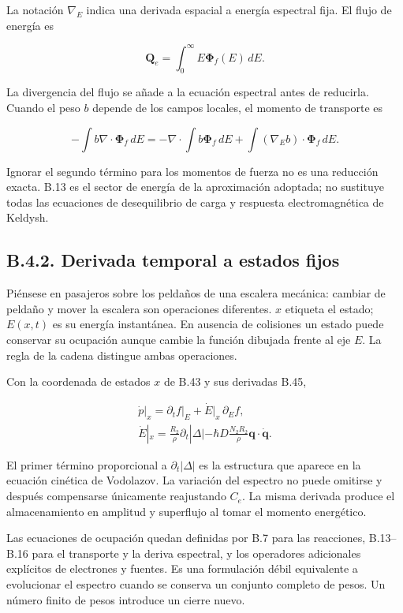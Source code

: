\documentclass[
  spanish,
  10pt,
  a4paper,
]{article}
\begin{document}
La notación \(\nabla_E\) indica una derivada espacial a energía
espectral fija. El flujo de energía es

\[
\mathbf Q_e=\int_0^\infty E\boldsymbol\Phi_f(E)\,dE.
\tag{B.14}
\]

La divergencia del flujo se añade a la ecuación espectral antes de
reducirla. Cuando el peso \(b\) depende de los campos locales, el
momento de transporte es

\[
-\int b\nabla\cdot\boldsymbol\Phi_f\,dE
=-\nabla\cdot\int b\boldsymbol\Phi_f\,dE
+\int(\nabla_Eb)\cdot\boldsymbol\Phi_f\,dE. \tag{B.15}
\]

Ignorar el segundo término para los momentos de fuerza no es una
reducción exacta. B.13 es el sector de energía de la aproximación
adoptada; no sustituye todas las ecuaciones de desequilibrio de carga y
respuesta electromagnética de Keldysh.

\subsection{B.4.2. Derivada temporal a estados
fijos}\label{b.4.2.-derivada-temporal-a-estados-fijos}

Piénsese en pasajeros sobre los peldaños de una escalera mecánica:
cambiar de peldaño y mover la escalera son operaciones diferentes. \(x\)
etiqueta el estado; \(E(x,t)\) es su energía instantánea. En ausencia de
colisiones un estado puede conservar su ocupación aunque cambie la
función dibujada frente al eje \(E\). La regla de la cadena distingue
ambas operaciones.

Con la coordenada de estados \(x\) de B.43 y sus derivadas B.45,

\[
\begin{gathered}
\left.\dot p\right|_x=
\left.\partial_tf\right|_E+\dot E|_x\,\partial_Ef,\\
\dot E|_x=\frac{R_2}{\rho}\partial_t|\Delta|
-\hbar D\frac{N_2R_2}{\rho}\mathbf q\cdot\dot{\mathbf q}.
\end{gathered} \tag{B.16}
\]

El primer término proporcional a \(\partial_t|\Delta|\) es la estructura
que aparece en la ecuación cinética de Vodolazov. La variación del
espectro no puede omitirse y después compensarse únicamente reajustando
\(C_e\). La misma derivada produce el almacenamiento en amplitud y
superflujo al tomar el momento energético.

Las ecuaciones de ocupación quedan definidas por B.7 para las
reacciones, B.13--B.16 para el transporte y la deriva espectral, y los
operadores adicionales explícitos de electrones y fuentes. Es una
formulación débil equivalente a evolucionar el espectro cuando se
conserva un conjunto completo de pesos. Un número finito de pesos
introduce un cierre nuevo.
\end{document}
